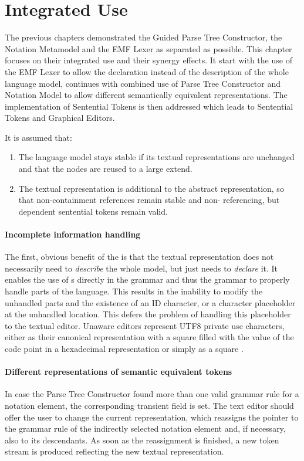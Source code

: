 \section{Integrated Use}
The previous chapters demonstrated the Guided Parse Tree Constructor, the Notation Metamodel and the EMF Lexer as separated as possible. This chapter focuses on their integrated use and their synergy effects. It start with the use of the EMF Lexer to allow the declaration instead of the description of the whole language model, continues with combined use of Parse Tree Constructor and Notation Model to allow different semantically equivalent representations. The implementation of Sentential Tokens is then addressed which leads to Sentential Tokens and Graphical Editors. 

It is assumed that:
\begin{enumerate}
	\item The language model stays stable if its textual representations are unchanged and that the nodes are reused to a large extend.
	\item The textual representation is additional to the abstract representation, so that non-containment references remain stable and non- referencing, but  dependent sentential tokens remain valid.
\end{enumerate}


\paragraph{Incomplete information handling}
The first, obvious benefit of the  is that the textual representation does not necessarily need to \emph{describe} the whole model, but just needs to \emph{declare} it. It enables the use of s directly in the grammar and thus the grammar to properly handle parts of the language. This results in the inability to modify the unhandled parts and the existence of an ID character, or a character placeholder at the unhandled location. This defers the problem of handling this placeholder to the textual editor. Unaware editors represent UTF8 private use characters, either as their canonical representation with a square filled with the value of the code point in a hexadecimal representation or simply as a square \code{$\square$}.

\paragraph{Different representations of semantic equivalent tokens}
In case the Parse Tree Constructor found more than one valid grammar rule for a notation element, the corresponding transient field is set. The text editor should offer the user to change the current representation, which reassigns the pointer to the grammar rule of the indirectly selected notation element and, if necessary, also to its descendants. As soon as the reassignment is finished, a new token stream is produced reflecting the new textual representation.

